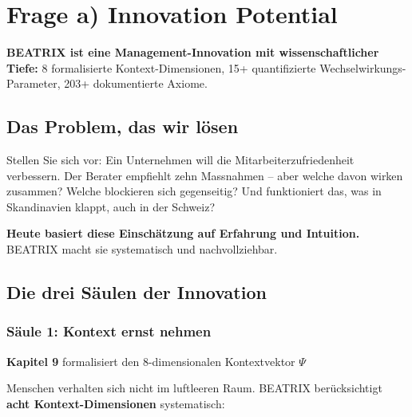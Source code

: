 \documentclass[11pt,a4paper]{article}
\begin{document}
\newpage


\section{Frage a) Innovation Potential}

\begin{keyinsight}
\textbf{BEATRIX ist eine Management-Innovation mit wissenschaftlicher Tiefe:} 8 formalisierte Kontext-Dimensionen, 15+ quantifizierte Wechselwirkungs-Parameter, 203+ dokumentierte Axiome.
\end{keyinsight}

\subsection{Das Problem, das wir lösen}

Stellen Sie sich vor: Ein Unternehmen will die Mitarbeiterzufriedenheit verbessern. Der Berater empfiehlt zehn Massnahmen -- aber welche davon wirken zusammen? Welche blockieren sich gegenseitig? Und funktioniert das, was in Skandinavien klappt, auch in der Schweiz?

\textbf{Heute basiert diese Einschätzung auf Erfahrung und Intuition.} BEATRIX macht sie systematisch und nachvollziehbar.

\subsection{Die drei Säulen der Innovation}

\subsubsection{Säule 1: Kontext ernst nehmen}

\begin{ebfbox}
\textbf{Kapitel 9} formalisiert den 8-dimensionalen Kontextvektor $\Psi$
\end{ebfbox}

Menschen verhalten sich nicht im luftleeren Raum. BEATRIX berücksichtigt \textbf{acht Kontext-Dimensionen} systematisch:
\end{document}
